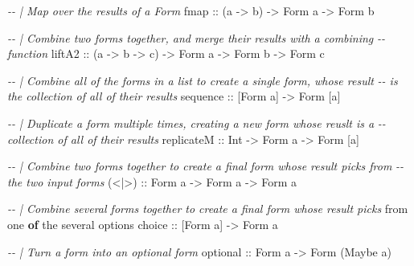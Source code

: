 \documentclass[]{article}
\newenvironment{Shaded}{}{}
\newcommand{\CommentTok}[1]{\textcolor[rgb]{0.38,0.63,0.69}{\textit{#1}}}
\newcommand{\DataTypeTok}[1]{\textcolor[rgb]{0.56,0.13,0.00}{#1}}
\newcommand{\FunctionTok}[1]{\textcolor[rgb]{0.02,0.16,0.49}{#1}}
\newcommand{\KeywordTok}[1]{\textcolor[rgb]{0.00,0.44,0.13}{\textbf{#1}}}
\newcommand{\NormalTok}[1]{#1}
\newcommand{\OtherTok}[1]{\textcolor[rgb]{0.00,0.44,0.13}{#1}}
\begin{document}
\begin{Shaded}
\begin{Highlighting}[]
\CommentTok{{-}{-} | Map over the results of a Form}
\FunctionTok{fmap}\OtherTok{   ::}\NormalTok{ (a }\OtherTok{{-}\textgreater{}}\NormalTok{ b) }\OtherTok{{-}\textgreater{}} \DataTypeTok{Form}\NormalTok{ a }\OtherTok{{-}\textgreater{}} \DataTypeTok{Form}\NormalTok{ b}

\CommentTok{{-}{-} | Combine two forms together, and merge their results with a combining}
\CommentTok{{-}{-} function}
\OtherTok{liftA2 ::}\NormalTok{ (a }\OtherTok{{-}\textgreater{}}\NormalTok{ b }\OtherTok{{-}\textgreater{}}\NormalTok{ c) }\OtherTok{{-}\textgreater{}} \DataTypeTok{Form}\NormalTok{ a }\OtherTok{{-}\textgreater{}} \DataTypeTok{Form}\NormalTok{ b }\OtherTok{{-}\textgreater{}} \DataTypeTok{Form}\NormalTok{ c}

\CommentTok{{-}{-} | Combine all of the forms in a list to create a single form, whose result}
\CommentTok{{-}{-} is the collection of all of their results}
\FunctionTok{sequence}\OtherTok{ ::}\NormalTok{ [}\DataTypeTok{Form}\NormalTok{ a] }\OtherTok{{-}\textgreater{}} \DataTypeTok{Form}\NormalTok{ [a]}

\CommentTok{{-}{-} | Duplicate a form multiple times, creating a new form whose reuslt is a}
\CommentTok{{-}{-} collection of all of their results}
\OtherTok{replicateM ::} \DataTypeTok{Int} \OtherTok{{-}\textgreater{}} \DataTypeTok{Form}\NormalTok{ a }\OtherTok{{-}\textgreater{}} \DataTypeTok{Form}\NormalTok{ [a]}

\CommentTok{{-}{-} | Combine two forms together to create a final form whose result picks from}
\CommentTok{{-}{-} the two input forms}
\OtherTok{(\textless{}|\textgreater{}) ::} \DataTypeTok{Form}\NormalTok{ a }\OtherTok{{-}\textgreater{}} \DataTypeTok{Form}\NormalTok{ a }\OtherTok{{-}\textgreater{}} \DataTypeTok{Form}\NormalTok{ a}

\CommentTok{{-}{-} | Combine several forms together to create a final form whose result picks}
\NormalTok{from one }\KeywordTok{of}\NormalTok{ the several options}
\OtherTok{choice ::}\NormalTok{ [}\DataTypeTok{Form}\NormalTok{ a] }\OtherTok{{-}\textgreater{}} \DataTypeTok{Form}\NormalTok{ a}

\CommentTok{{-}{-} | Turn a form into an optional form}
\OtherTok{optional ::} \DataTypeTok{Form}\NormalTok{ a }\OtherTok{{-}\textgreater{}} \DataTypeTok{Form}\NormalTok{ (}\DataTypeTok{Maybe}\NormalTok{ a)}
\end{Highlighting}
\end{Shaded}
\end{document}
